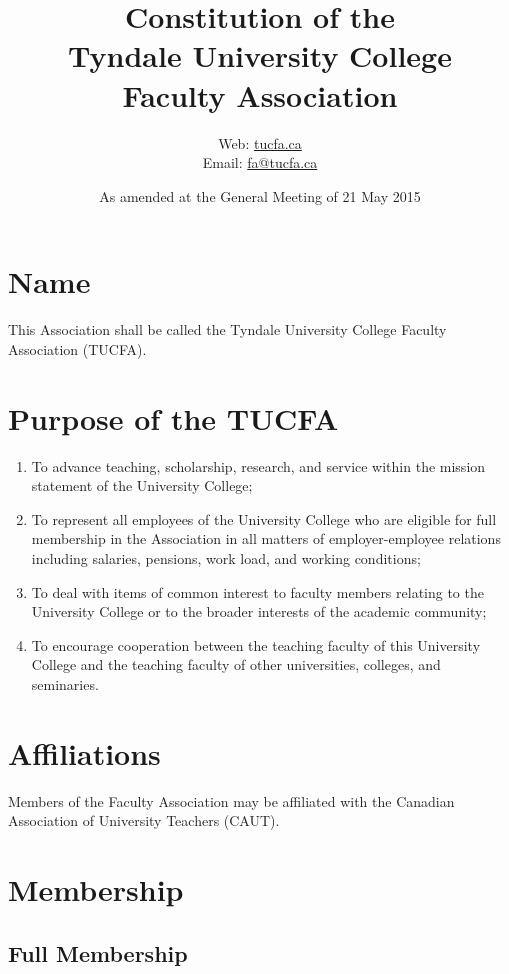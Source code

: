 \documentclass[12pt]{article}
\title{Constitution of the\\Tyndale University College\\Faculty Association}
\author{%
  Web: \href{http://tucfa.ca/}{tucfa.ca}\\
  Email: \href{mailto:fa@tucfa.ca}{fa@tucfa.ca}
}
\date{%
  As amended at the General Meeting of 21 May 2015
}
\begin{document}
\maketitle
\tableofcontents

\section{Name}

This Association shall be called the Tyndale University College Faculty Association (TUCFA).

\section{Purpose of the TUCFA}

\begin{enumerate}
\item
To advance teaching, scholarship, research, and service within the mission statement of the University College;
\item
To represent all employees of the University College who are eligible for full membership in the Association in all matters of employer-employee relations including salaries, pensions, work load, and working conditions;
\item
To deal with items of common interest to faculty members relating to the University College or to the broader interests of the academic community;
\item
To encourage cooperation between the teaching faculty of this University College and the teaching faculty of other universities, colleges, and seminaries.
\end{enumerate}

\section{Affiliations}

Members of the Faculty Association may be affiliated with the Canadian Association of University Teachers (CAUT).

\section{Membership}

\subsection{Full Membership}
\end{document}
